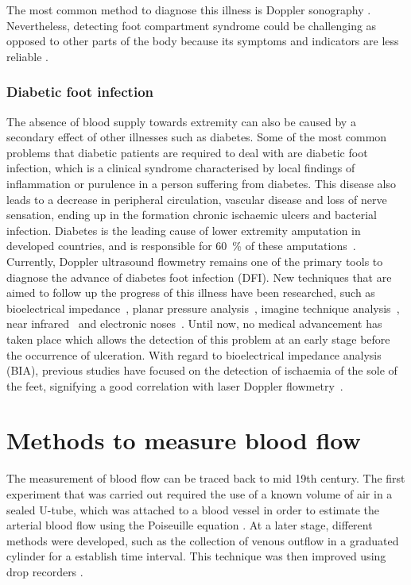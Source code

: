 The most common method to diagnose this illness is Doppler sonography \cite{chhabra2013compartment}. Nevertheless, detecting foot compartment syndrome could be challenging as opposed to other parts of the body because its symptoms and indicators are less reliable \cite{dodd2013foot}.

\subsubsection{Diabetic foot infection}
\label{section literature 2.3} 
The absence of blood supply towards extremity can also be caused by a secondary effect of other illnesses such as diabetes. Some of the most common problems that diabetic patients are required to deal with are diabetic foot infection, which is a clinical syndrome characterised by local findings of inflammation or purulence in a person suffering from diabetes. This disease also leads to a decrease in peripheral circulation, vascular disease and loss of nerve sensation, ending up in the formation chronic ischaemic ulcers and bacterial infection. Diabetes is the leading cause of lower extremity amputation in developed countries, and is responsible for \SI{60}{\percent} of these amputations~\cite{ucckay2014diabetic}.  Currently, Doppler ultrasound flowmetry remains one of the primary tools to diagnose the advance of diabetes foot infection (DFI). New techniques that are aimed to follow up the progress of this illness have been researched, such as bioelectrical impedance~\cite{cheng2012application}, planar pressure analysis~\cite{dos2010insole}, imagine technique analysis~\cite{songer2001tissue}, near infrared~\cite{papazoglou2008assessment} and electronic noses~\cite{yusuf2013diagnosis}. Until now, no medical advancement has taken place which allows the detection of this problem at an early stage before the occurrence of ulceration. With regard to bioelectrical impedance analysis (BIA), previous studies have focused on the detection of ischaemia of the sole of the feet, signifying a good correlation with laser Doppler flowmetry~\cite{cheng2012application}. 

\section{Methods to measure blood flow }
The measurement of blood flow can be traced back to mid 19th century. The first experiment that was carried out required the use of a known volume of air in a sealed U-tube, which was attached to a blood vessel in order to estimate the arterial blood flow using the Poiseuille equation \cite{dokunin1958modification}. At a later stage, different methods were developed, such as the collection of venous outflow in a graduated cylinder for a establish time interval. This technique was then improved using drop recorders \cite{jayanthy2011measuring}.

